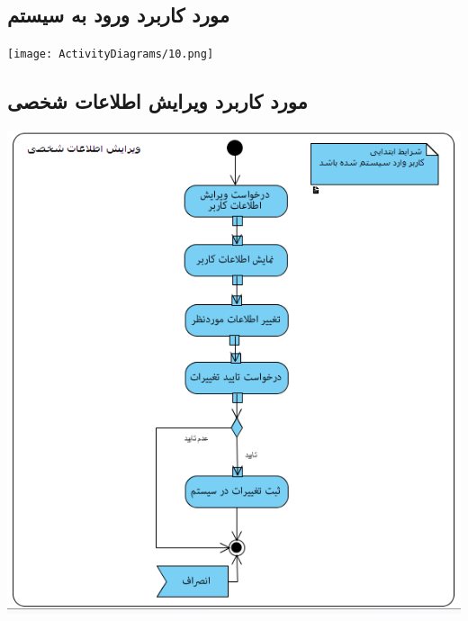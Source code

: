 \newpage
\vspace{2cm}
\subsection*{مورد کاربرد ورود به سیستم}
\vspace{2cm}
\begin{center}
\texttt{[image: ActivityDiagrams/10.png]}
\end{center}

\newpage
\vspace{2cm}
\subsection*{مورد کاربرد ویرایش اطلاعات شخصی}
\vspace{2cm}
\begin{center}
\includegraphics[width=\textwidth]{ActivityDiagrams/11.png}
\end{center}

\newpage
\vspace{2cm}
